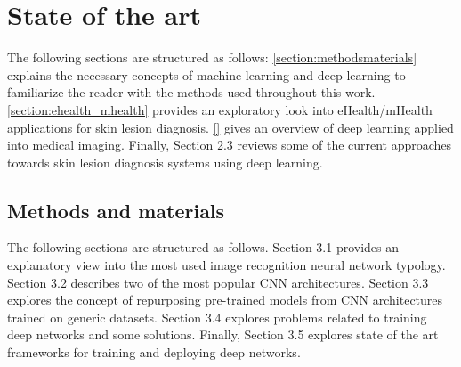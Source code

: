 

\chapter{State of the art}
\label{chapter:sota}

The following sections are structured as follows: \autoref{section:methodsmaterials} explains the necessary concepts of machine learning and deep learning to familiarize the reader with the methods used throughout this work. \autoref{section:ehealth_mhealth}  provides an exploratory look into eHealth/mHealth applications for skin lesion diagnosis. \autoref{} gives an overview of deep learning applied into medical imaging. Finally, Section 2.3 reviews some of the current approaches towards skin lesion diagnosis systems using deep learning.


\section{Methods and materials}
\label{section:methodsmaterials}
The following sections are structured as follows. Section 3.1 provides an explanatory view into the most used image recognition neural network typology. Section 3.2 describes two of the most popular \ac{CNN} architectures. Section 3.3 explores the concept of repurposing pre-trained models from \ac{CNN} architectures trained on generic datasets. Section 3.4 explores problems related to training deep networks and some solutions. Finally, Section 3.5 explores state of the art frameworks for training and deploying deep networks.   


